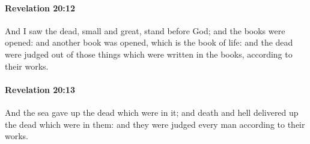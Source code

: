 		\paragraph{Revelation 20:12} %
			\label{REVELATIONNT-20-12}

			And I saw the dead, small and great, stand before God; and the books were opened: and another book was opened, which is the book of life: and the dead were judged out of those things which were written in the books, according to their works.

			\begin{framed}
			\scriptsize
				\begin{compactdesc}
					\item[SBLG] 
				\end{compactdesc}
			\end{framed}

		\paragraph{Revelation 20:13} %
			\label{REVELATIONNT-20-13}

			And the sea gave up the dead which were in it; and death and hell delivered up the dead which were in them: and they were judged every man according to their works.

